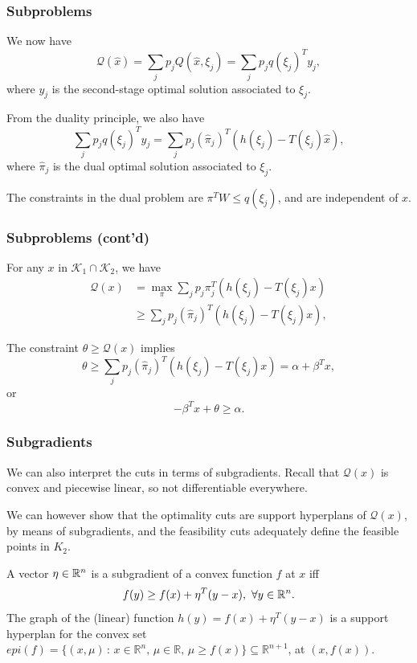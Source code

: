 \documentclass{beamer}
\def\cK{\mathcal{K}}
\begin{document}
\begin{frame}
\frametitle{Subproblems}
	
We now have
\[
\mathcal{Q}(\hat{x}) = \sum_j p_j Q(\hat{x}, \xi_j) = \sum_j p_jq(\xi_j)^Ty_j,
\]
where $y_j$ is the second-stage optimal solution associated to $\xi_j$.
	
\mbox{}

From the duality principle, we also have	
\[
\sum_j p_j q(\xi_j)^T y_j = \sum_j p_j (\hat{\pi}_j)^T(h(\xi_j) -
T(\xi_j)\hat{x}),
\]
where $\hat{\pi}_j$ is the dual optimal solution associated to $\xi_j$.
	
\mbox{}
	
The constraints in the dual problem are $\pi^T W \leq q(\xi_j)$, and are independent of $x$.
	
\end{frame}

\begin{frame}
\frametitle{Subproblems (cont'd)}
	
For any $x$ in $\cK_1 \cap \cK_2$, we have
\begin{align*}
\mathcal{Q}(x) &= \max_{\pi} \sum_j p_j \pi_j^T(h(\xi_j) - T(\xi_j)x) \\
& \geq \sum_j p_j(\hat{\pi}_j)^T(h(\xi_j) - T(\xi_j)x),
\end{align*}
	
\mbox{}
	
The constraint $\theta \geq \mathcal{Q}(x)$ implies
\[
\theta \geq \sum_j p_j(\hat{\pi}_j)^T(h(\xi_j) - T(\xi_j)x) = \alpha +
\beta^Tx,
\]
or
\[
-\beta^Tx + \theta \geq \alpha.
\]
	
\end{frame}




\begin{frame}
\frametitle{Subgradients}

We can also interpret the cuts in terms of subgradients.
Recall that $\mathcal{Q}(x)$ is convex and piecewise linear, so not differentiable everywhere.
	
\mbox{}
	
We can however show that the optimality cuts are support hyperplans of $\mathcal{Q}(x)$, by means of subgradients, and the feasibility cuts adequately define the feasible points in $K_2$.

\mbox{}
	
A vector $\eta \in \mathbb{R}^n$ is a {\red subgradient} of a convex function $f$ at $x$ iff
\[ f(y) \geq f(x) + \eta^T(y-x),\ \forall y \in \mathbb{R}^n.\]
The graph of the (linear) function $h(y) = f(x) + \eta^T(y-x)$ is a support hyperplan for the convex set $epi(f) = \{ (x, \mu) \, : \, x \in \mathbb{R}^n,\, \mu \in \mathbb{R},\, \mu \ge f(x) \} \subseteq \mathbb{R}^{n+1}$, at $(x, f(x))$.
	
\end{frame}
\end{document}
